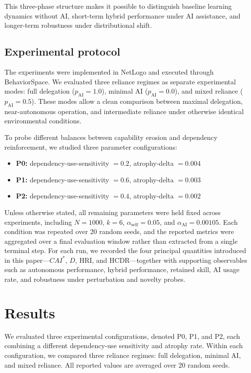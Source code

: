 \documentclass[11pt,a4paper]{article}
\begin{document}
This three-phase structure makes it possible to distinguish baseline learning dynamics without AI, short-term hybrid performance under AI assistance, and longer-term robustness under distributional shift.

\subsection{Experimental protocol}

The experiments were implemented in NetLogo and executed through BehaviorSpace. We evaluated three reliance regimes as separate experimental modes: full delegation ($p_{\mathrm{AI}}=1.0$), minimal AI ($p_{\mathrm{AI}}=0.0$), and mixed reliance ($p_{\mathrm{AI}}=0.5$). These modes allow a clean comparison between maximal delegation, near-autonomous operation, and intermediate reliance under otherwise identical environmental conditions.

To probe different balances between capability erosion and dependency reinforcement, we studied three parameter configurations:
\begin{itemize}
\item \textbf{P0:} dependency-use-sensitivity $=0.2$, atrophy-delta $=0.004$
\item \textbf{P1:} dependency-use-sensitivity $=0.6$, atrophy-delta $=0.003$
\item \textbf{P2:} dependency-use-sensitivity $=0.4$, atrophy-delta $=0.002$
\end{itemize}

Unless otherwise stated, all remaining parameters were held fixed across experiments, including $N=1000$, $k=6$, $\alpha_{\mathrm{self}}=0.05$, and $\alpha_{\mathrm{AI}}=0.00105$. Each condition was repeated over 20 random seeds, and the reported metrics were aggregated over a final evaluation window rather than extracted from a single terminal step. For each run, we recorded the four principal quantities introduced in this paper---$CAI^*$, $D$, HRI, and HCDR---together with supporting observables such as autonomous performance, hybrid performance, retained skill, AI usage rate, and robustness under perturbation and novelty probes.

\section{Results}

We evaluated three experimental configurations, denoted P0, P1, and P2, each combining a different dependency-use sensitivity and atrophy rate. Within each configuration, we compared three reliance regimes: full delegation, minimal AI, and mixed reliance. All reported values are averaged over 20 random seeds.
\end{document}
